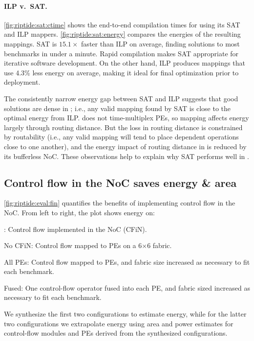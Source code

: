 \figRipTideSATResults
\paragraph{ILP v.\ SAT.}
\autoref{fig:riptide:sat:ctime} shows the end-to-end compilation times for \riptide using its SAT and ILP mappers.
% 
\autoref{fig:riptide:sat:energy} compares the energies of the resulting mappings.
% 
SAT is $15.1\times$ faster than ILP on average, finding solutions to most benchmarks in under a minute.
% 
Rapid compilation makes SAT appropriate for iterative software development.
% 
On the other hand, ILP produces mappings that use 4.3\% less energy on average, making it ideal for final optimization prior to deployment.

The consistently narrow energy gap between SAT and ILP suggests that good solutions are dense in \riptide;
i.e., any valid mapping found by SAT is close to the optimal energy from ILP.
%
\riptide does not time-multiplex PEs, so mapping affects energy largely through routing distance.
%
But the loss in routing distance is constrained by routability
(i.e., any valid mapping will tend to place dependent operations close to one another),
and the energy impact of routing distance in \riptide is reduced by its bufferless NoC.
%
These observations help to explain why SAT performs well in \riptide.

\figRipTideFINResults
\subsection{Control flow in the NoC saves energy \& area}
\label{sec:eval:fin}
\autoref{fig:riptide:eval:fin} quantifies the benefits of implementing control flow in the NoC.
% 
From left to right, the plot shows energy on:
\begin{compactitem}
\item \riptide: Control flow implemented in the NoC (CFiN).
\item No CFiN: Control flow mapped to PEs on a 6$\times$6 fabric.
\item All PEs: Control flow mapped to PEs, and fabric size increased as necessary to fit each benchmark.
\item Fused: One control-flow operator fused into each PE, and fabric sized increased as necessary to fit each benchmark.
\end{compactitem}
% 
We synthesize the first two configurations to estimate energy, while for the latter two configurations we extrapolate energy using area and power estimates for control-flow modules and PEs derived from the synthesized configurations.
 

